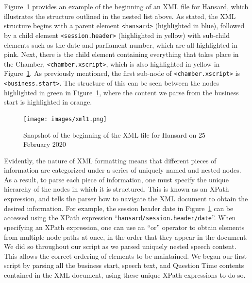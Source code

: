 \documentclass[
  letterpaper,
  DIV=11,
  numbers=noendperiod]{scrartcl}
\begin{document}
Figure~\ref{fig-xml1} provides an example of the beginning of an XML
file for Hansard, which illustrates the structure outlined in the nested
list above. As stated, the XML structure begins with a parent element
\texttt{\textless{}hansard\textgreater{}} (highlighted in blue),
followed by a child element
\texttt{\textless{}session.header\textgreater{}} (highlighted in yellow)
with sub-child elements such as the date and parliament number, which
are all highlighted in pink. Next, there is the child element containing
everything that takes place in the Chamber,
\texttt{\textless{}chamber.xscript\textgreater{}}, which is also
highlighted in yellow in Figure~\ref{fig-xml1}. As previously mentioned,
the first sub-node of \texttt{\textless{}chamber.xscript\textgreater{}}
is \texttt{\textless{}business.start\textgreater{}}. The structure of
this can be seen between the nodes highlighted in green in
Figure~\ref{fig-xml1}, where the content we parse from the business
start is highlighted in orange.

\begin{figure}

{\centering \texttt{[image: images/xml1.png]}

}

\caption{\label{fig-xml1}Snapshot of the beginning of the XML file for
Hansard on 25 February 2020}

\end{figure}

Evidently, the nature of XML formatting means that different pieces of
information are categorized under a series of uniquely named and nested
nodes. As a result, to parse each piece of information, one must specify
the unique hierarchy of the nodes in which it is structured. This is
known as an XPath expression, and tells the parser how to navigate the
XML document to obtain the desired information. For example, the session
header date in Figure~\ref{fig-xml1} can be accessed using the XPath
expression ``\texttt{hansard/session.header/date}''. When specifying an
XPath expression, one can use an ``or'' operator to obtain elements from
multiple node paths at once, in the order that they appear in the
document. We did so throughout our script as we parsed uniquely nested
speech content. This allows the correct ordering of elements to be
maintained. We began our first script by parsing all the business start,
speech text, and Question Time contents contained in the XML document,
using these unique XPath expressions to do so.
\end{document}
